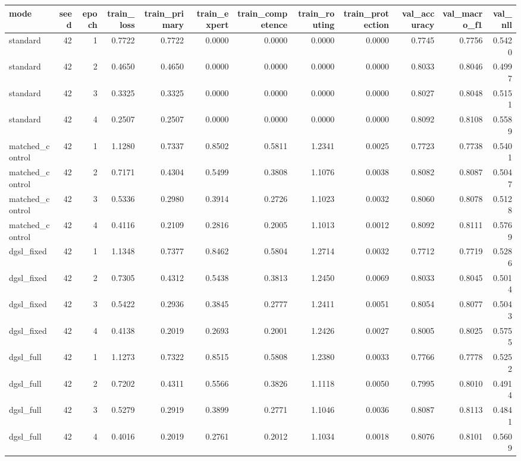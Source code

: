 \begin{tabular}{lrrrrrrrrrrr}
\toprule
mode & seed & epoch & train\_loss & train\_primary & train\_expert & train\_competence & train\_routing & train\_protection & val\_accuracy & val\_macro\_f1 & val\_nll \\
\midrule
standard & 42 & 1 & 0.7722 & 0.7722 & 0.0000 & 0.0000 & 0.0000 & 0.0000 & 0.7745 & 0.7756 & 0.5420 \\
standard & 42 & 2 & 0.4650 & 0.4650 & 0.0000 & 0.0000 & 0.0000 & 0.0000 & 0.8033 & 0.8046 & 0.4997 \\
standard & 42 & 3 & 0.3325 & 0.3325 & 0.0000 & 0.0000 & 0.0000 & 0.0000 & 0.8027 & 0.8048 & 0.5151 \\
standard & 42 & 4 & 0.2507 & 0.2507 & 0.0000 & 0.0000 & 0.0000 & 0.0000 & 0.8092 & 0.8108 & 0.5589 \\
matched\_control & 42 & 1 & 1.1280 & 0.7337 & 0.8502 & 0.5811 & 1.2341 & 0.0025 & 0.7723 & 0.7738 & 0.5401 \\
matched\_control & 42 & 2 & 0.7171 & 0.4304 & 0.5499 & 0.3808 & 1.1076 & 0.0038 & 0.8082 & 0.8087 & 0.5047 \\
matched\_control & 42 & 3 & 0.5336 & 0.2980 & 0.3914 & 0.2726 & 1.1023 & 0.0032 & 0.8060 & 0.8078 & 0.5128 \\
matched\_control & 42 & 4 & 0.4116 & 0.2109 & 0.2816 & 0.2005 & 1.1013 & 0.0012 & 0.8092 & 0.8111 & 0.5769 \\
dgsl\_fixed & 42 & 1 & 1.1348 & 0.7377 & 0.8462 & 0.5804 & 1.2714 & 0.0032 & 0.7712 & 0.7719 & 0.5286 \\
dgsl\_fixed & 42 & 2 & 0.7305 & 0.4312 & 0.5438 & 0.3813 & 1.2450 & 0.0069 & 0.8033 & 0.8045 & 0.5014 \\
dgsl\_fixed & 42 & 3 & 0.5422 & 0.2936 & 0.3845 & 0.2777 & 1.2411 & 0.0051 & 0.8054 & 0.8077 & 0.5043 \\
dgsl\_fixed & 42 & 4 & 0.4138 & 0.2019 & 0.2693 & 0.2001 & 1.2426 & 0.0027 & 0.8005 & 0.8025 & 0.5755 \\
dgsl\_full & 42 & 1 & 1.1273 & 0.7322 & 0.8515 & 0.5808 & 1.2380 & 0.0033 & 0.7766 & 0.7778 & 0.5252 \\
dgsl\_full & 42 & 2 & 0.7202 & 0.4311 & 0.5566 & 0.3826 & 1.1118 & 0.0050 & 0.7995 & 0.8010 & 0.4914 \\
dgsl\_full & 42 & 3 & 0.5279 & 0.2919 & 0.3899 & 0.2771 & 1.1046 & 0.0036 & 0.8087 & 0.8113 & 0.4841 \\
dgsl\_full & 42 & 4 & 0.4016 & 0.2019 & 0.2761 & 0.2012 & 1.1034 & 0.0018 & 0.8076 & 0.8101 & 0.5609 \\
\bottomrule
\end{tabular}
